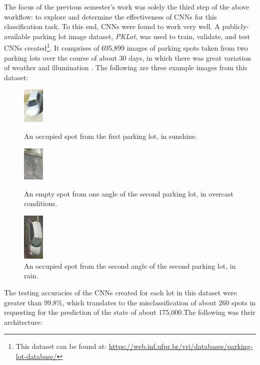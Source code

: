 \documentclass[a4paper, 11pt]{article} %
\begin{document}
	The focus of the previous semester's work was solely the third step of the above workflow: to 
	explore and determine the effectiveness of CNNs for this classification task. To this end, CNNs were 
	found to work very well. A publicly-available parking lot image dataset, \textit{PKLot}, was used to 
	train, validate, and test CNNs created\footnote{This dataset can be found at: 
	\hyperlink{https://web.inf.ufpr.br/vri/databases/parking-lot-database/}
	{https://web.inf.ufpr.br/vri/databases/parking-lot-database/}}. It comprises of 695,899 images of 
	parking spots taken from two parking lots over the course of about 30 days, in which there was 
	great variation of weather and illumination \cite{pklot-paper}\relax. The following are three example 
	images from this dataset:
	\vskip 5mm
	\begin{figure}[h]
		\centering
		\includegraphics[width=1cm]{figures/pklot_example_1.jpg}
		\caption{An occupied spot from the first parking lot, in sunshine.}
		\vspace{5mm}
		\includegraphics[width=1cm]{figures/pklot_example_2.jpg}
		\caption{An empty spot from one angle of the second parking lot, in overcast conditions.}
		\vspace{5mm}
		\includegraphics[width=1cm]{figures/pklot_example_3.jpg}
		\caption{An occupied spot from the second angle of the second parking lot, in rain.}
	\end{figure}
	\hspace*{-6mm}The testing accuracies of the CNNs created for each lot in this dataset were greater 
	than 99.8\%, which translates to the misclassification of about 260 spots in requesting for the 
	prediction of the state of about 175,000.The following was their architecture:
	\newpage
\end{document}
